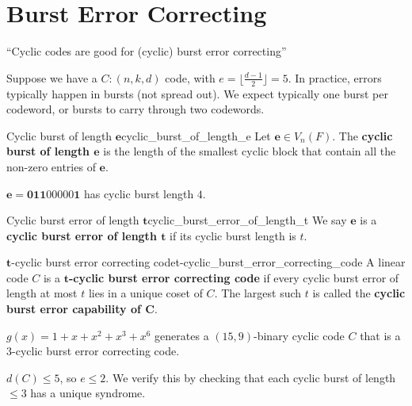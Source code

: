 \section{Burst Error Correcting}
``Cyclic codes are good for (cyclic) burst error correcting''

Suppose we have a $ C:(n,k,d) $ code, with $ e=\lfloor \frac{d-1}{2} \rfloor=5 $.
In practice, errors typically happen in bursts (not spread out).
We expect typically one burst per codeword, or bursts to carry through
two codewords.

\begin{Definition}{Cyclic burst of length $\bm{e}$}{cyclic_burst_of_length_e}
    Let $ \bm{e}\in V_n(F) $. The \textbf{cyclic burst of length $\bm{e}$}
    is the length of the smallest cyclic block that contain all the non-zero
    entries of $ \bm{e} $.
\end{Definition}

\begin{Example}{}{}
    $ \bm{e}=\bm{011}00000\bm{1} $ has cyclic burst length $ 4 $.
\end{Example}

\begin{Definition}{Cyclic burst error of length $ \bm{t} $}{cyclic_burst_error_of_length_t}
    We say $ \bm{e} $ is a \textbf{cyclic burst error of length $ \bm{t} $} if its cyclic
    burst length is $ t $.
\end{Definition}

\begin{Definition}{$ \bm{t} $-cyclic burst error correcting code}{t-cyclic_burst_error_correcting_code}
    A linear code $ C $ is a \textbf{$ \bm{t} $-cyclic burst error correcting code}
    if every cyclic burst error of length at most $ t $ lies in a unique coset
    of $ C $. The largest such $ t $ is called the \textbf{cyclic burst error capability
        of $ \bm{C} $}.
\end{Definition}

\begin{Example}{}{}
    $ g(x)=1+x+x^2+x^3+x^6 $ generates a $ (15,9) $-binary cyclic code $ C $
    that is a $ 3 $-cyclic burst error correcting code.
\end{Example}

$ d(C)\leqslant 5 $, so $ e\leqslant 2 $. We verify this by checking that
each cyclic burst of length $ \leqslant 3 $ has a unique syndrome.


